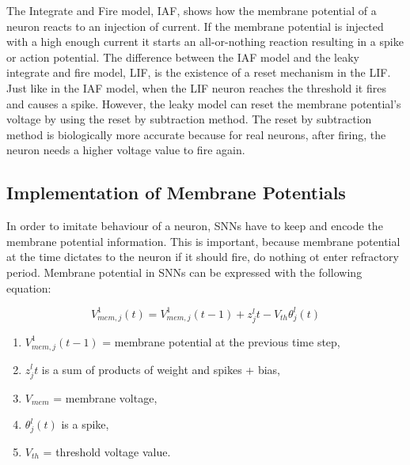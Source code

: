 The Integrate and Fire model, IAF, shows how the membrane potential of a neuron reacts to an injection of current. If the membrane potential is injected with a high enough current it starts an all-or-nothing reaction resulting in a spike or action potential. The difference between the IAF model and the leaky integrate and fire model, LIF, is the existence of a reset mechanism in the LIF. Just like in the IAF model, when the LIF neuron reaches the threshold it fires and causes a spike. However, the leaky model can reset the membrane potential's voltage by using the reset by subtraction method. The reset by subtraction method is biologically more accurate because for real neurons, after firing, the neuron needs a higher voltage value to fire again.



\subsection{Implementation of Membrane Potentials}

In order to imitate behaviour of a neuron, SNNs have to keep and encode the membrane potential information. This is important, because membrane potential at the time  dictates to the neuron if it should fire, do nothing ot enter refractory period. Membrane potential in SNNs can be expressed with the following equation:


\begin{equation}
	V_{mem, j}^1(t) = V_{mem, j}^1(t-1) + z_j^l{t} - V_{th}\theta_j^l(t)
\end{equation}

\begingroup
\fontsize{7pt}{9pt}\selectfont
\begin{enumerate}
    \item[] \begin{center}  $V_{mem, j}^1(t-1)$ = membrane potential at the previous time step, \end{center}
	\item[]  \begin{center} $z_j^l{t}$ is a sum of products of weight and spikes + bias, \end{center}
	\item[] \begin{center}  $V_{mem}$ = membrane voltage, \end{center}
	\item[] \begin{center}  $\theta_j^l(t)$ is a spike, \end{center}
	\item[] \begin{center}  $V_{th}$ = threshold voltage value. \end{center}
\end{enumerate}
\endgroup

